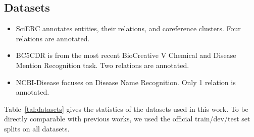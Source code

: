 \documentclass[10pt, conference, compsocconf]{IEEEtran}
\newcommand{\Scierc}{\textsc{S}ci-\textsc{erc}\xspace}
\begin{document}
\subsection{Datasets}

\begin{itemize}
    \item SciERC\cite{luan-etal-2018-multi} annotates entities, 
    their relations, and coreference clusters. 
    Four relations are annotated. 
    \item BC5CDR\cite{li2016biocreative} is from the most 
    recent BioCreative V Chemical and Disease Mention Recognition task. 
    Two relations are annotated.
    \item NCBI-Disease\cite{dougan2014ncbi} focuses on Disease Name Recognition. 
    Only 1 relation is annotated.
\end{itemize}
Table~\ref{tal:datasets} gives the statistics of the datasets used in this work. To be directly comparable with previous works, we
used the official train/dev/test set splits on all datasets.


\end{document}
